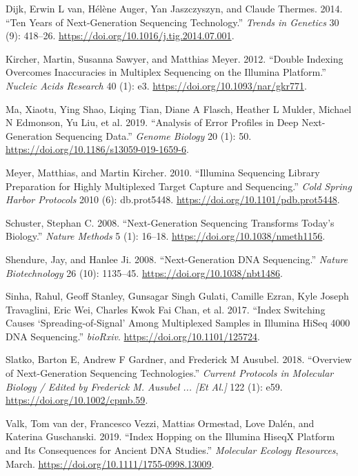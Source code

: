 \documentclass[
  letterpaper,
]{book}
\newlength{\cslhangindent}
\newlength{\cslentryspacingunit} %
\newenvironment{CSLReferences}[2] %
 {%
  \setlength{\parindent}{0pt}
  \ifodd #1
  \let\oldpar\par
  \def\par{\hangindent=\cslhangindent\oldpar}
  \fi
  \setlength{\parskip}{#2\cslentryspacingunit}
 }%
 {}
\begin{document}
\hypertarget{refs}{}
\begin{CSLReferences}{1}{0}
\leavevmode{}%
Dijk, Erwin L van, Hélène Auger, Yan Jaszczyszyn, and Claude Thermes.
2014. {``Ten Years of Next-Generation Sequencing Technology.''}
\emph{Trends in Genetics} 30 (9): 418--26.
\url{https://doi.org/10.1016/j.tig.2014.07.001}.

\leavevmode{}%
Kircher, Martin, Susanna Sawyer, and Matthias Meyer. 2012. {``Double
Indexing Overcomes Inaccuracies in Multiplex Sequencing on the Illumina
Platform.''} \emph{Nucleic Acids Research} 40 (1): e3.
\url{https://doi.org/10.1093/nar/gkr771}.

\leavevmode{}%
Ma, Xiaotu, Ying Shao, Liqing Tian, Diane A Flasch, Heather L Mulder,
Michael N Edmonson, Yu Liu, et al. 2019. {``Analysis of Error Profiles
in Deep Next-Generation Sequencing Data.''} \emph{Genome Biology} 20
(1): 50. \url{https://doi.org/10.1186/s13059-019-1659-6}.

\leavevmode{}%
Meyer, Matthias, and Martin Kircher. 2010. {``Illumina Sequencing
Library Preparation for Highly Multiplexed Target Capture and
Sequencing.''} \emph{Cold Spring Harbor Protocols} 2010 (6):
db.prot5448. \url{https://doi.org/10.1101/pdb.prot5448}.

\leavevmode{}%
Schuster, Stephan C. 2008. {``Next-Generation Sequencing Transforms
Today's Biology.''} \emph{Nature Methods} 5 (1): 16--18.
\url{https://doi.org/10.1038/nmeth1156}.

\leavevmode{}%
Shendure, Jay, and Hanlee Ji. 2008. {``Next-Generation {DNA}
Sequencing.''} \emph{Nature Biotechnology} 26 (10): 1135--45.
\url{https://doi.org/10.1038/nbt1486}.

\leavevmode{}%
Sinha, Rahul, Geoff Stanley, Gunsagar Singh Gulati, Camille Ezran, Kyle
Joseph Travaglini, Eric Wei, Charles Kwok Fai Chan, et al. 2017.
{``Index Switching Causes {`Spreading-of-Signal'} Among Multiplexed
Samples in Illumina {HiSeq} 4000 {DNA} Sequencing.''} \emph{bioRxiv}.
\url{https://doi.org/10.1101/125724}.

\leavevmode{}%
Slatko, Barton E, Andrew F Gardner, and Frederick M Ausubel. 2018.
{``Overview of Next-Generation Sequencing Technologies.''} \emph{Current
Protocols in Molecular Biology / Edited by Frederick M. Ausubel ...
{[}Et Al.{]}} 122 (1): e59. \url{https://doi.org/10.1002/cpmb.59}.

\leavevmode{}%
Valk, Tom van der, Francesco Vezzi, Mattias Ormestad, Love Dalén, and
Katerina Guschanski. 2019. {``Index Hopping on the Illumina {HiseqX}
Platform and Its Consequences for Ancient {DNA} Studies.''}
\emph{Molecular Ecology Resources}, March.
\url{https://doi.org/10.1111/1755-0998.13009}.

\end{CSLReferences}
\end{document}
